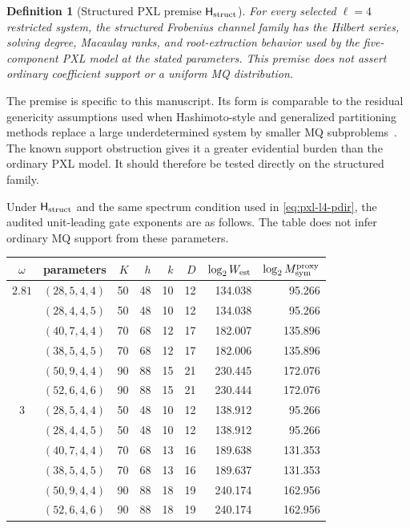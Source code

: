 \documentclass[11pt]{article}
\newtheorem{definition}[definition]{Definition}
\begin{document}
\begin{definition}[Structured PXL premise $\mathsf H_{\rm struct}$]
\label{def:pxl-structured}
For every selected $\ell=4$ restricted system, the structured Frobenius
channel family has the Hilbert series, solving degree, Macaulay ranks, and
root-extraction behavior used by the five-component PXL model at the stated
parameters.  This premise does not assert ordinary coefficient support or a
uniform MQ distribution.
\end{definition}

The premise is specific to this manuscript.  Its form is comparable to the
residual genericity assumptions used when Hashimoto-style and generalized
partitioning methods replace a large underdetermined system by smaller MQ
subproblems~\cite{Hashimoto2023,AsanumaEtAl2026}.  The known support
obstruction gives it a greater evidential burden than the ordinary PXL model.
It should therefore be tested directly on the structured family.

Under $\mathsf H_{\rm struct}$ and the same spectrum condition used in
\eqref{eq:pxl-l4-pdir}, the audited unit-leading gate exponents are as follows.
The table does not infer ordinary MQ support from these parameters.

\begin{center}
\scriptsize
\setlength{\tabcolsep}{4pt}
\begin{tabular}{@{}c l r r r r r r@{}}
\toprule
$\omega$ & parameters & $K$ & $h$ & $k$ & $D$
& $\log_2 W_{\rm est}$ & $\log_2 M_{\rm sym}^{\rm proxy}$\\
\midrule
$2.81$ & $(28,5,4,4)$  & 50 & 48 & 10 & 12 & 134.038 & 95.266\\
       & $(28,4,4,5)$  & 50 & 48 & 10 & 12 & 134.038 & 95.266\\
       & $(40,7,4,4)$  & 70 & 68 & 12 & 17 & 182.007 & 135.896\\
       & $(38,5,4,5)$  & 70 & 68 & 12 & 17 & 182.006 & 135.896\\
       & $(50,9,4,4)$  & 90 & 88 & 15 & 21 & 230.445 & 172.076\\
       & $(52,6,4,6)$  & 90 & 88 & 15 & 21 & 230.444 & 172.076\\
\midrule
$3$    & $(28,5,4,4)$  & 50 & 48 & 10 & 12 & 138.912 & 95.266\\
       & $(28,4,4,5)$  & 50 & 48 & 10 & 12 & 138.912 & 95.266\\
       & $(40,7,4,4)$  & 70 & 68 & 13 & 16 & 189.638 & 131.353\\
       & $(38,5,4,5)$  & 70 & 68 & 13 & 16 & 189.637 & 131.353\\
       & $(50,9,4,4)$  & 90 & 88 & 18 & 19 & 240.174 & 162.956\\
       & $(52,6,4,6)$  & 90 & 88 & 18 & 19 & 240.174 & 162.956\\
\bottomrule
\end{tabular}
\end{center}
\end{document}

